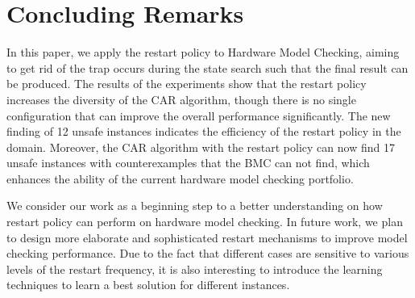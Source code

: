 \section{Concluding Remarks}
In this paper, we apply the restart policy to Hardware Model Checking, aiming to get rid of the trap occurs during the state search such that the final result can be produced. The results of the experiments show that the restart policy increases the diversity of the CAR algorithm, though there is no single configuration that can improve the overall performance significantly. The new finding of 12 unsafe instances indicates the efficiency of the restart policy in the domain. Moreover, the CAR algorithm with the restart policy can now find 17 unsafe instances with counterexamples that the BMC can not find, which enhances the ability of the current hardware model checking portfolio. 

We consider our work as a beginning step to a better understanding on how restart policy can perform on hardware model checking.
In future work, we plan to design more elaborate and sophisticated restart mechanisms to improve model checking performance. Due to the fact that different cases are sensitive to various levels of the restart frequency, it is also interesting to introduce the learning techniques to learn a best solution for different instances. 


